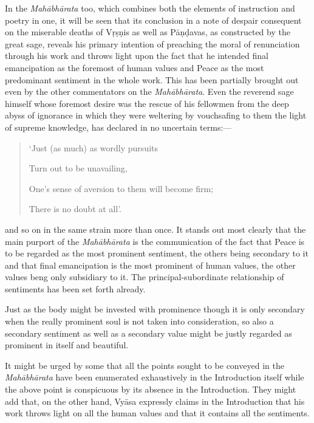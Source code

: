 \documentclass[12pt]{book}
\begin{document}
In the \textit{Mahābhārata} too, which combines both the elements
of instruction and poetry in one, it will be seen that its conclusion
in a note of despair consequent on the miserable deaths of
Vṛṣṇis as well as Pāṇḍavas, as constructed by the great sage,
reveals his primary intention of preaching the moral of renunciation through his work and throws light upon the fact that he
intended final emancipation as the foremost of human values
and Peace as the most predominant sentiment in the whole
work. This has been partially brought out even by the other
commentators on the \textit{Mahābhārata}. Even the reverend sage
himself whose foremost desire was the rescue of his fellowmen
from the deep abyss of ignorance in which they were weltering
by vouchsafing to them the light of supreme knowledge, has
declared in no uncertain terms:---

\begin{quotation}
\begin{em}
`Just (as much) as wordly pursuits

Turn out to be unavailing,

One's sense of aversion to them will become firm;

There is no doubt at all'.
\end{em}
\end{quotation}

and so on in the same strain more than once. It stands out
most clearly that the main purport of the \textit{Mahābhārata} is the
communication of the fact that Peace is to be regarded as
the most prominent sentiment, the others being secondary to it
and that final emancipation is the most prominent of human
values, the other values beng only subsidiary to it. The principal-subordinate relationship of sentiments has been set forth already.

Just as the body might be invested with prominence though
it is only secondary when the really prominent soul is not taken
into consideration, so also a secondary sentiment as well as a
secondary value might be justly regarded as prominent in itself
and beautiful.

It might be urged by some that all the points sought to be
conveyed in the \textit{Mahābhārata} have been enumerated exhaustively
in the Introduction itself while the above point is conspicuous
by its absence in the Introduction. They might add that, on the
other hand, Vyāsa expressly claims in the Introduction that his
work throws light on all the human values and that it contains
all the sentiments.
\end{document}
